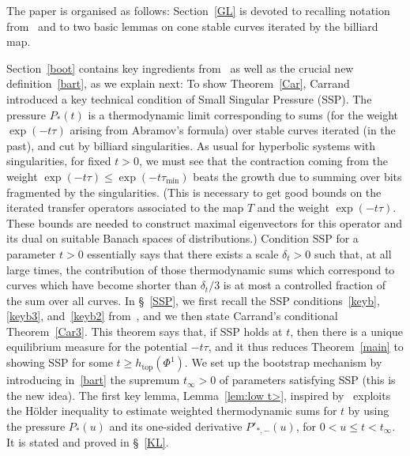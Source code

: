 \documentclass[10pt]{amsart}
\theoremstyle{definition}\newtheorem{defi}[theo]{Definition}\newtheorem{rema}[theo]{Remark}\newtheorem{exam}[theo]{Example}\newtheorem{exem}[theo]{Example}\newtheorem{nota}[theo]{Notation}
\newcommand{\htop}{h_{\scriptstyle{\text{top}}}}
\begin{document}
The paper is organised as follows: Section~\ref{GL} is devoted to recalling notation from~\cite{BD1} and to two basic lemmas on cone stable curves iterated by the billiard map.

Section~\ref{boot} contains key ingredients from~\cite{Ca} as well as the crucial new definition~\eqref{bart}, as we explain next: To show Theorem~\ref{Car}, Carrand introduced a key technical condition of Small Singular Pressure (SSP). The pressure $P_*(t)$ is a thermodynamic limit corresponding to sums (for the weight $\exp(-t\tau)$ arising from Abramov's formula) over stable curves iterated (in the past), and cut by billiard singularities. As usual for hyperbolic systems with singularities, for fixed $t>0$, we must see that the contraction coming from the weight $\exp(-t\tau)\le \exp (-t\tau_{\min})$ beats the growth due to summing over bits fragmented by the singularities. (This is necessary to get good bounds on the iterated transfer operators associated to the map $T$ and the weight $\exp(-t\tau)$. These bounds are needed to construct maximal eigenvectors for this operator and its dual on suitable Banach spaces of distributions.) Condition SSP for a parameter $t>0$ essentially says that there exists a scale $\delta_t>0$ such that, at all large times, the contribution of those thermodynamic sums which correspond to curves which have become shorter than $\delta_t/3$ is at most a controlled fraction of the sum over all curves. In \S~\ref{SSP}, we first recall the SSP conditions~\eqref{keyb}, \eqref{keyb3}, and~\eqref{keyb2} from~\cite{Ca}, and we then state Carrand's conditional Theorem~\ref{Car3}. This theorem says that, if SSP holds at $t$, then there is a unique equilibrium measure for the potential $-t\tau$, and it thus reduces Theorem~\ref{main} to showing SSP for some $t\ge \htop(\Phi^1)$. We set up the bootstrap mechanism by introducing in~\eqref{bart} the supremum $t_\infty>0$ of parameters satisfying SSP (this is the new idea). The first key lemma, Lemma~\ref{lem:low t>}, inspired by~\cite[Lemma~3.10]{BD2} exploits the H\"older inequality to estimate weighted thermodynamic sums for $t$ by using the pressure $P_*(u)$ and its one-sided derivative $P'_{*,-}(u)$, for $0<u\le t<t_\infty$. It is stated and proved in \S~\ref{KL}.
\end{document}
